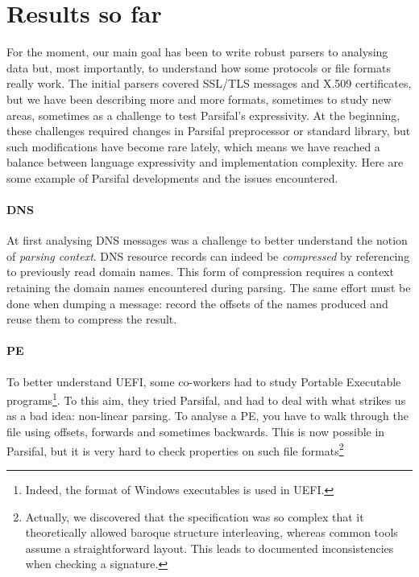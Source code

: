 \documentclass[conference]{IEEEtran}
\begin{document}
\section{Results so far}

For the moment, our main goal has been to write robust parsers to
analysing data but, most importantly, to understand how some protocols
or file formats really work. The initial parsers covered SSL/TLS
messages and X.509 certificates, but we have been describing more and
more formats, sometimes to study new areas, sometimes as a challenge
to test Parsifal's expressivity. At the beginning, these challenges
required changes in Parsifal preprocessor or standard library, but
such modifications have become rare lately, which means we have
reached a balance between language expressivity and
implementation complexity. Here are some example of Parsifal
developments and the issues encountered.


\paragraph{DNS} At first analysing DNS messages was a challenge to
better understand the notion of \emph{parsing context}. DNS resource records
can indeed be \emph{compressed} by referencing to previously read
domain names. This form of compression requires a context retaining
the domain names encountered during parsing. The same effort must be
done when dumping a message: record the offsets of the names produced
and reuse them to compress the result.

\paragraph{PE} To better understand UEFI, some co-workers had to study
Portable Executable programs\footnote{Indeed, the format of Windows
  executables is used in UEFI.}. To this aim, they tried Parsifal, and
had to deal with what strikes us as a bad idea: non-linear parsing. To
analyse a PE, you have to walk through the file using offsets,
forwards and sometimes backwards. This is now possible in Parsifal,
but it is very hard to check properties on such file
formats\footnote{Actually, we discovered that the specification was so
  complex that it theoretically allowed baroque structure
  interleaving, whereas common tools assume a straightforward
  layout. This leads to documented inconsistencies when checking a
  signature.}
\end{document}
